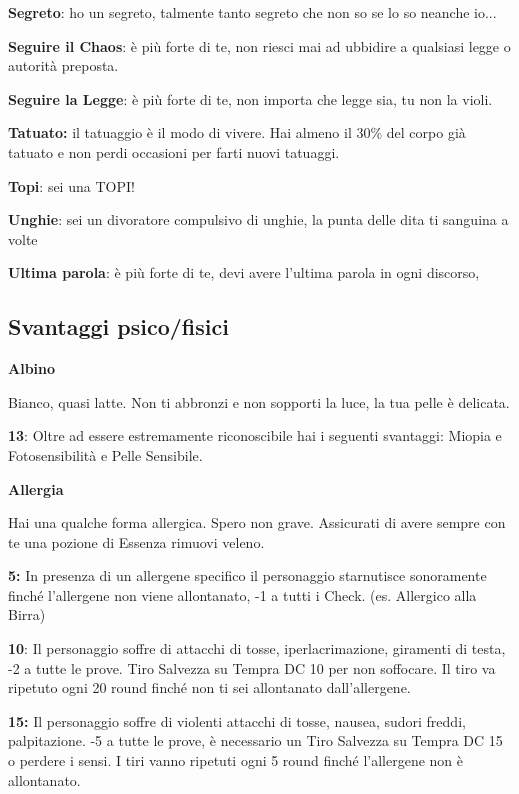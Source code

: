 \documentclass[a4paper,11pt,twoside,openany]{book}
\begin{document}
{\textbf{Segreto}: ho un segreto, talmente tanto segreto che non so se lo so neanche io...

\textbf{Seguire il Chaos}: è più forte di te, non riesci mai ad ubbidire a qualsiasi legge o autorità preposta.

\textbf{Seguire la Legge}: è più forte di te, non importa che legge sia, tu non la violi.

\textbf{Tatuato:} il tatuaggio è il modo di vivere. Hai almeno il 30\% del corpo già tatuato e non perdi occasioni per farti nuovi tatuaggi.

\textbf{Topi}: sei una TOPI!

\textbf{Unghie}: sei un divoratore compulsivo di unghie, la punta delle dita ti sanguina a volte

\textbf{Ultima parola}: è più forte di te, devi avere l'ultima parola in ogni discorso,

\pagebreak

\subsection{Svantaggi psico/fisici}

\label{svantaggi-psicofisici}

\textbf{Albino}

Bianco, quasi latte. Non ti abbronzi e non sopporti la luce, la tua pelle è delicata.

\textbf{13}: Oltre ad essere estremamente riconoscibile hai i seguenti svantaggi: Miopia e Fotosensibilità e Pelle Sensibile.

\textbf{Allergia}

Hai una qualche forma allergica. Spero non grave. Assicurati di avere sempre con te una pozione di Essenza rimuovi veleno.

\textbf{5:} In presenza di un allergene specifico il personaggio starnutisce sonoramente finché l'allergene non viene allontanato, -1 a tutti i Check. (es. Allergico alla Birra)

\textbf{10}: Il personaggio soffre di attacchi di tosse, iperlacrimazione, giramenti di testa, -2 a tutte le prove. Tiro Salvezza su Tempra DC 10 per non soffocare. Il tiro va ripetuto ogni 20 round finché non ti sei allontanato dall'allergene.

\textbf{15:} Il personaggio soffre di violenti attacchi di tosse, nausea, sudori freddi, palpitazione. -5 a tutte le prove, è necessario un Tiro Salvezza su Tempra DC 15 o perdere i sensi. I tiri vanno ripetuti ogni 5 round finché l'allergene non è allontanato.

}
\end{document}
